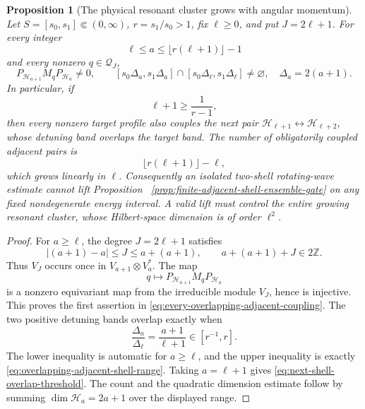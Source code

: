 \documentclass[11pt]{article}
\newtheorem{proposition}[theorem]{Proposition}
\theoremstyle{remark}
\begin{document}
\begin{proposition}[The physical resonant cluster grows with angular momentum]
\label{prop:adjacent-shell-growing-resonant-cluster}
Let $S=[s_0,s_1]\Subset(0,\infty)$, $r=s_1/s_0>1$, fix $\ell\geq0$, and put
$J=2\ell+1$.  For every integer
\begin{equation}
 \ell\leq a\leq\lfloor r(\ell+1)\rfloor-1
 \label{eq:overlapping-adjacent-shell-range}
\end{equation}
and every nonzero $q\in\mathcal Q_J$,
\begin{equation}
 P_{\mathcal H_{a+1}}M_qP_{\mathcal H_a}\neq0,
 \qquad
 [s_0\Delta_a,s_1\Delta_a]\cap
 [s_0\Delta_\ell,s_1\Delta_\ell]\neq\varnothing,
 \quad
 \Delta_a=2(a+1).
 \label{eq:every-overlapping-adjacent-coupling}
\end{equation}
In particular, if
\begin{equation}
 \ell+1\geq\frac1{r-1},
 \label{eq:next-shell-overlap-threshold}
\end{equation}
then every nonzero target profile also couples the next pair
$\mathcal H_{\ell+1}\leftrightarrow\mathcal H_{\ell+2}$, whose detuning
band overlaps the target band.  The number of obligatorily coupled adjacent
pairs is
\[
 \lfloor r(\ell+1)\rfloor-\ell,
\]
which grows linearly in $\ell$.  Consequently an isolated two-shell
rotating-wave estimate cannot lift Proposition
~\ref{prop:finite-adjacent-shell-ensemble-gate} on any fixed nondegenerate
energy interval.  A valid lift must control the entire growing resonant
cluster, whose Hilbert-space dimension is of order $\ell^2$.
\end{proposition}

\begin{proof}
For $a\geq\ell$, the degree $J=2\ell+1$ satisfies
\[
 |(a+1)-a|\leq J\leq a+(a+1),
 \qquad
 a+(a+1)+J\in2\mathbb Z.
\]
Thus $V_J$ occurs once in
$V_{a+1}\otimes V_a^\ast$.  The map
\[
 q\longmapsto P_{\mathcal H_{a+1}}M_qP_{\mathcal H_a}
\]
is a nonzero equivariant map from the irreducible module $V_J$, hence is
injective.  This proves the first assertion in
\eqref{eq:every-overlapping-adjacent-coupling}.  The two positive detuning
bands overlap exactly when
\[
 \frac{\Delta_a}{\Delta_\ell}
 =\frac{a+1}{\ell+1}\in[r^{-1},r].
\]
The lower inequality is automatic for $a\geq\ell$, and the upper inequality
is exactly \eqref{eq:overlapping-adjacent-shell-range}.  Taking
$a=\ell+1$ gives \eqref{eq:next-shell-overlap-threshold}.  The count and the
quadratic dimension estimate follow by summing
$\dim\mathcal H_a=2a+1$ over the displayed range.
\end{proof}
\end{document}
